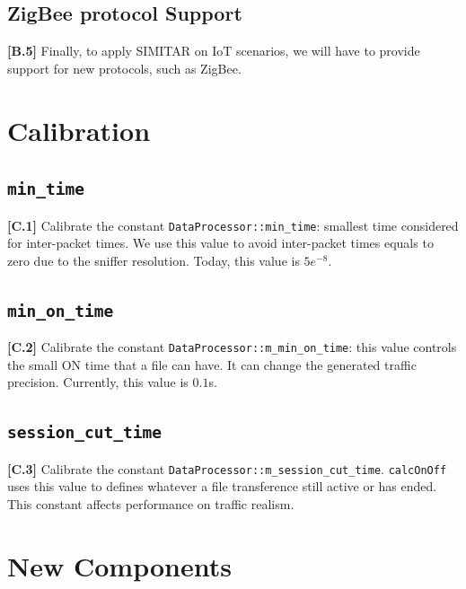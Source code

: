 \subsection{ZigBee protocol Support}

\textbf{[B.5]} Finally, to apply SIMITAR on IoT scenarios, we will have to provide support for new protocols, such as ZigBee\cite{zigbee}.



\section{Calibration}


\subsection{\texttt{min\_time}}

\textbf{[C.1]} Calibrate the constant \texttt{DataProcessor::min\_time}: smallest time considered for inter-packet times. We use this value to avoid inter-packet times equals to zero due to the sniffer resolution. Today, this value is $5e^{-8}$.

\subsection{\texttt{min\_on\_time}}

\textbf{[C.2]} Calibrate the constant \texttt{DataProcessor::m\_min\_on\_time}: this value controls the small ON time that a file can have. It can change the generated traffic precision. Currently, this value is $0.1$s. 

\subsection{\texttt{session\_cut\_time}}

\textbf{[C.3]} Calibrate the constant \texttt{DataProcessor::m\_session\_cut\_time}. \texttt{calcOnOff} uses this value to defines whatever a file transference still active or has ended.  This constant affects performance on traffic realism. 



\section{New Components}


